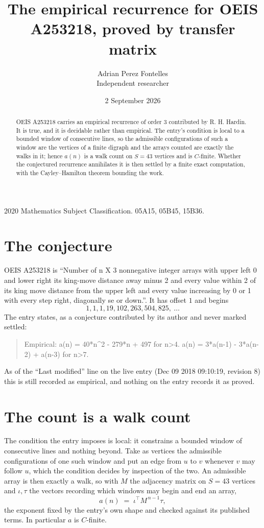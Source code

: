 \documentclass[11pt,a4paper]{article}
\title{The empirical recurrence for OEIS A253218, proved by transfer matrix}
\author{Adrian Perez Fontelles\\ \small Independent researcher}
\date{2 September 2026}
\theoremstyle{plain}
\theoremstyle{definition}
\begin{document}
\maketitle

\begin{abstract}
OEIS A253218 carries an empirical recurrence of order $3$ contributed by R. H. Hardin. It is
true, and it is decidable rather than empirical. The entry's condition is local to a bounded window of consecutive lines, so
the admissible configurations of such a window are the vertices of a finite digraph and the
arrays counted are exactly the walks in it; hence $a(n)$ is a walk count on $S=43$ vertices
and is $C$-finite. Whether the conjectured recurrence annihilates it is then settled by a
finite exact computation, with the Cayley--Hamilton theorem bounding the work.
\end{abstract}

\noindent\small 2020 Mathematics Subject Classification. 05A15, 05B45, 15B36.\normalsize

\section{The conjecture}

OEIS A253218 is ``Number of n X 3 nonnegative integer arrays with upper left 0 and lower right its king-move distance away minus 2 and every value within 2 of its king move distance from the upper left and every value increasing by 0 or 1 with every step right, diagonally se or down.''. It has offset $1$ and begins
\[
1, 1, 1, 19, 102, 263, 504, 825,\ \dots
\]
The entry states, as a conjecture contributed by its author and never marked settled:
\begin{quote}
Empirical: a(n) = 40*n\^{}2 - 279*n + 497 for n>4. a(n) = 3*a(n-1) - 3*a(n-2) + a(n-3) for n>7.
\end{quote}
As of the ``Last modified'' line on the live entry (Dec 09 2018 09:10:19, revision 8) this is still
recorded as empirical, and nothing on the entry records it as proved.

\section{The count is a walk count}

The condition the entry imposes is local: it constrains a bounded window of consecutive lines and nothing beyond. Take as
vertices the admissible configurations of one such window and put an edge from $u$ to $v$
whenever $v$ may follow $u$, which the condition decides by inspection of the two. An
admissible array is then exactly a walk, so with $M$ the adjacency matrix on $S=43$ vertices
and $\iota,\tau$ the vectors recording which windows may begin and end an array,
\[
a(n)\;=\;\iota^{\!\top}M^{\,n-1}\tau ,
\]
the exponent fixed by the entry's own shape and checked against its published terms. In
particular $a$ is $C$-finite.
\end{document}
